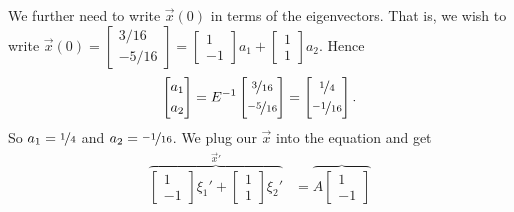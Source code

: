 \documentclass{ximera}
\begin{document}
\begin{exampleSol}
    We further need to write $\vec{x}(0)$ in terms of the eigenvectors. That is, we wish to write 
    $\vec{x}(0) = 
    \left[ \begin{smallmatrix}
        3/16 \\
        -5/16
    \end{smallmatrix} \right] 
    = 
    \left[ \begin{smallmatrix}
        1 \\
        -1
    \end{smallmatrix} \right] 
    a_1 +
    \left[ \begin{smallmatrix}
        1 \\
        1
    \end{smallmatrix} \right] 
    a_2$.  Hence
    \begin{equation*}
    \begin{bmatrix}
        a_1 \\
        \noalign{\smallskip}
        a_2
    \end{bmatrix} = 
    E^{-1}
    \begin{bmatrix}
        \nicefrac{3}{16} \\
        \noalign{\smallskip}
        \nicefrac{-5}{16}
    \end{bmatrix}
    =
    \begin{bmatrix}
        \nicefrac{1}{4} \\
        \noalign{\smallskip}
        \nicefrac{-1}{16}
    \end{bmatrix} .
    \end{equation*}
    So $a_1 = \nicefrac{1}{4}$ and $a_2 = \nicefrac{-1}{16}$. We plug our $\vec{x}$ into the equation and get
    \begin{equation*}
        \begin{split}
            \overbrace{
                \begin{bmatrix}
                    1 \\
                    -1
                \end{bmatrix} 
                \xi_1' +
                \begin{bmatrix}
                    1 \\
                    1
                \end{bmatrix} 
                \xi_2'
            }^{\vec{x}'}
            & = 
            \overbrace{ A
                \begin{bmatrix}
                    1 \\
                    -1

\end{bmatrix}}
\end{split}
\end{equation*}
\end{exampleSol}
\end{document}
